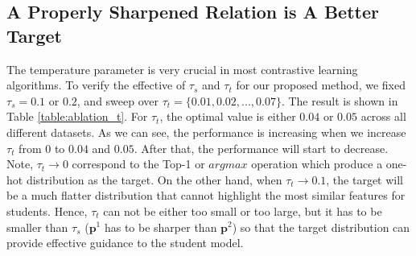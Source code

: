 \documentclass{article}
\newcommand{\<}{\left\langle}
\renewcommand{\>}{\right\rangle}
\begin{document}
\subsection{A Properly Sharpened Relation is A Better Target}
The temperature parameter is very crucial in most contrastive learning algorithms. To verify the effective of $\tau_s$ and $\tau_t$ for our proposed method, we fixed $\tau_s = 0.1$ or $0.2$, and sweep over $\tau_t = \{0.01, 0.02, ..., 0.07\}$. The result is shown in Table \ref{table:ablation_t}. For $\tau_t$, the optimal value is either $0.04$ or $0.05$ across all different datasets. As we can see, the performance is increasing when we increase $\tau_t$ from $0$ to $0.04$ and $0.05$. After that, the performance will start to decrease. Note, $\tau_t \rightarrow 0$ correspond to the Top-1 or $argmax$ operation which produce a one-hot distribution as the target. On the other hand, when $\tau_t \rightarrow 0.1$, the target will be a much flatter distribution that cannot highlight the most similar features for students. Hence, $\tau_t$ can not be either too small or too large, but it has to be smaller than $\tau_s$ ($\mathbf{p}^1$ has to be sharper than $\mathbf{p}^2$) so that the target distribution can provide effective guidance to the student model.
\vspace{-5pt}
\end{document}
